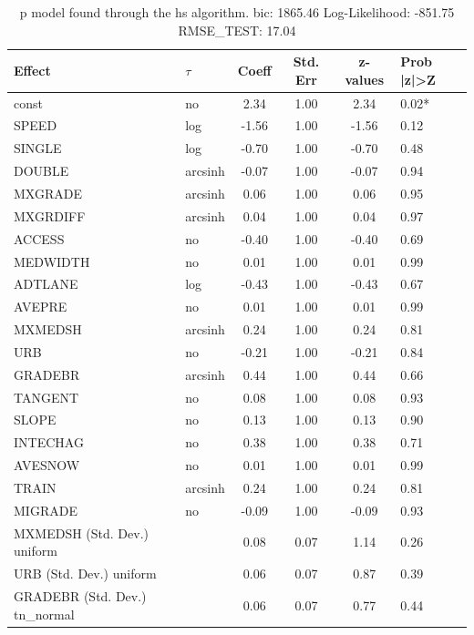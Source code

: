\begin{table}
	\caption{p model found through the hs algorithm. bic: 1865.46 Log-Likelihood: -851.75 RMSE_TEST: 17.04}
	\begin{center}
		\begin{tabular}{|l|l|c|c|c|l|}
			\hline
			Effect & $\tau$ & Coeff & Std. Err & z-values & Prob |z|>Z \\
			\hline
			const & no & 2.34 & 1.00 & 2.34 & 0.02* \\
			\hline
			SPEED & log & -1.56 & 1.00 & -1.56 & 0.12 \\
			\hline
			SINGLE & log & -0.70 & 1.00 & -0.70 & 0.48 \\
			\hline
			DOUBLE & arcsinh & -0.07 & 1.00 & -0.07 & 0.94 \\
			\hline
			MXGRADE & arcsinh & 0.06 & 1.00 & 0.06 & 0.95 \\
			\hline
			MXGRDIFF & arcsinh & 0.04 & 1.00 & 0.04 & 0.97 \\
			\hline
			ACCESS & no & -0.40 & 1.00 & -0.40 & 0.69 \\
			\hline
			MEDWIDTH & no & 0.01 & 1.00 & 0.01 & 0.99 \\
			\hline
			ADTLANE & log & -0.43 & 1.00 & -0.43 & 0.67 \\
			\hline
			AVEPRE & no & 0.01 & 1.00 & 0.01 & 0.99 \\
			\hline
			MXMEDSH & arcsinh & 0.24 & 1.00 & 0.24 & 0.81 \\
			\hline
			URB & no & -0.21 & 1.00 & -0.21 & 0.84 \\
			\hline
			GRADEBR & arcsinh & 0.44 & 1.00 & 0.44 & 0.66 \\
			\hline
			TANGENT & no & 0.08 & 1.00 & 0.08 & 0.93 \\
			\hline
			SLOPE & no & 0.13 & 1.00 & 0.13 & 0.90 \\
			\hline
			INTECHAG & no & 0.38 & 1.00 & 0.38 & 0.71 \\
			\hline
			AVESNOW & no & 0.01 & 1.00 & 0.01 & 0.99 \\
			\hline
			TRAIN & arcsinh & 0.24 & 1.00 & 0.24 & 0.81 \\
			\hline
			MIGRADE & no & -0.09 & 1.00 & -0.09 & 0.93 \\
			\hline
			MXMEDSH (Std. Dev.) uniform &  & 0.08 & 0.07 & 1.14 & 0.26 \\
			\hline
			URB (Std. Dev.) uniform &  & 0.06 & 0.07 & 0.87 & 0.39 \\
			\hline
			GRADEBR (Std. Dev.) tn_normal &  & 0.06 & 0.07 & 0.77 & 0.44 \\

\end{tabular}
\end{center}
\end{table}
